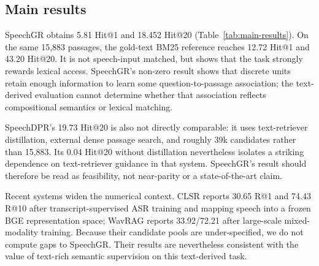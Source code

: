 \subsection{Main results}

SpeechGR obtains 5.81 Hit@1 and 18.452 Hit@20
(Table~\ref{tab:main-results}). On the same 15,883 passages, the gold-text BM25
reference reaches 12.72 Hit@1 and 43.20 Hit@20. It is not speech-input matched,
but shows that the task strongly rewards lexical access. SpeechGR's non-zero
result shows that discrete units retain enough information to learn some
question-to-passage association; the text-derived evaluation cannot determine
whether that association reflects compositional semantics or lexical matching.

SpeechDPR's 19.73 Hit@20 is also not directly comparable: it uses
text-retriever distillation, external dense passage search, and roughly 39k candidates
rather than 15,883. Its 0.04 Hit@20 without distillation nevertheless isolates
a striking dependence on text-retriever guidance in that system. SpeechGR's
result should therefore be read as feasibility, not near-parity or a
state-of-the-art claim.

Recent systems widen the numerical context. CLSR reports 30.65 R@1 and 74.43
R@10 after transcript-supervised ASR training and mapping speech into a frozen
BGE representation space; WavRAG reports 33.92/72.21 after large-scale
mixed-modality training. Because their candidate pools are under-specified,
we do not compute gaps to SpeechGR. Their results are nevertheless consistent
with the value of text-rich semantic supervision on this text-derived task.

